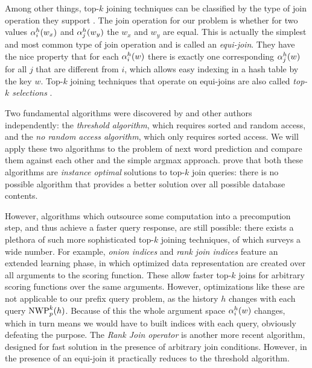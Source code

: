 Among other things, top-$k$ joining techniques can be classified by the type
of join operation they support \parencite{Ilyas2008}.
The join operation for our problem is whether for two values $\alpha^h_i(w_x)$
and $\alpha^h_j(w_y)$ the $w_x$ and $w_y$ are equal.
This is actually the simplest and most common type of join operation and is
called an \emph{equi-join}.
They have the nice property that for each $\alpha^h_i(w)$ there is exactly one
corresponding $\alpha^h_j(w)$ for all $j$ that are different from $i$, which
allows easy indexing in a hash table by the key $w$.
Top-$k$ joining techniques that operate on equi-joins are also called
\emph{top-$k$ selections} \parencite{Ilyas2008}.

Two fundamental algorithms were discovered by \textcite{Fagin2001} and other
authors independently: the \emph{threshold algorithm}, which requires sorted and
random access, and the \emph{no random access algorithm}, which only requires
sorted access.
We will apply these two algorithms to the problem of next word prediction and
compare them against each other and the simple argmax approach.
\textcite{Fagin2001} prove that both these algorithms are \emph{instance
optimal} solutions to top-$k$ join queries: there is no possible algorithm
that provides a better solution over all possible database contents.

However, algorithms which outsource some computation into a precompution step,
and thus achieve a faster query response, are still possible:
there exists a plethora of such more sophisticated top-$k$ joining techniques,
of which \textcite{Ilyas2008} surveys a wide number.
For example, \emph{onion indices} \parencite{Chang2000} and
\emph{rank join indices} \parencite{Tsaparas2003} feature an extended learning
phase, in which optimized data representation are created over all arguments to
the scoring function.
These allow faster top-$k$ joins for arbitrary scoring functions over the same
arguments.
However, optimizations like these are not applicable to our prefix query problem,
as the history $h$ changes with each query $\NWP[p][k](h)$.
Because of this the whole argument space $\alpha^h_i(w)$ changes, which in turn
means we would have to built indices with each query, obviously defeating the
purpose.
The \emph{Rank Join operator} \parencite{Ilyas2004} is another more recent
algorithm, designed for fast solution in the presence of arbitrary join
conditions.
However, in the presence of an equi-join it practically reduces to the threshold
algorithm.

